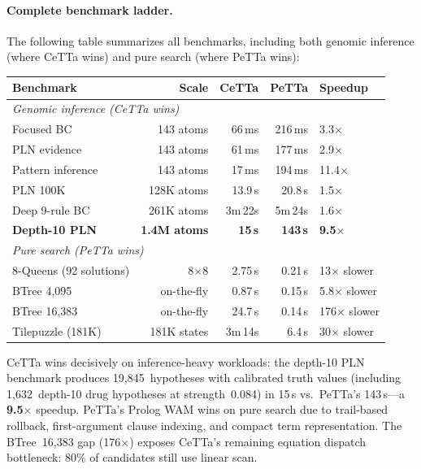\documentclass[11pt]{article}
\newcommand{\PeTTa}{\textup{PeTTa}}
\newcommand{\CeTTa}{\textup{CeTTa}}
\begin{document}
\paragraph{Complete benchmark ladder.}
The following table summarizes all benchmarks, including both genomic
inference (where \CeTTa{} wins) and pure search (where \PeTTa{} wins):

\begin{center}
\begin{tabular}{lrrrl}
\toprule
Benchmark & Scale & \CeTTa{} & \PeTTa{} & Speedup \\
\midrule
\multicolumn{5}{l}{\emph{Genomic inference (\CeTTa{} wins)}} \\
Focused BC         &     143 atoms &   66\,ms &   216\,ms & 3.3$\times$ \\
PLN evidence       &     143 atoms &   61\,ms &   177\,ms & 2.9$\times$ \\
Pattern inference  &     143 atoms &   17\,ms &   194\,ms & 11.4$\times$ \\
PLN 100K           & 128K atoms    &  13.9\,s &   20.8\,s & 1.5$\times$ \\
Deep 9-rule BC     & 261K atoms    & 3m\,22s  &  5m\,24s  & 1.6$\times$ \\
\textbf{Depth-10 PLN}  & \textbf{1.4M atoms}
                        & \textbf{15\,s} & \textbf{143\,s} & \textbf{9.5$\times$} \\
\midrule
\multicolumn{5}{l}{\emph{Pure search (\PeTTa{} wins)}} \\
8-Queens (92 solutions) &  8$\times$8 &  2.75\,s &  0.21\,s & 13$\times$ slower \\
BTree 4{,}095           & on-the-fly  &  0.87\,s &  0.15\,s & 5.8$\times$ slower \\
BTree 16{,}383          & on-the-fly  &  24.7\,s &  0.14\,s & 176$\times$ slower \\
Tilepuzzle (181K)       & 181K states & 3m\,14s  &  6.4\,s  & 30$\times$ slower \\
\bottomrule
\end{tabular}
\end{center}

\CeTTa{} wins decisively on inference-heavy workloads: the depth-10
PLN benchmark produces 19{,}845~hypotheses with calibrated truth values
(including 1{,}632~depth-10 drug hypotheses at strength~0.084) in
15\,s vs.\ \PeTTa{}'s 143\,s---a \textbf{9.5$\times$} speedup.
\PeTTa{}'s Prolog WAM wins on pure search due to trail-based rollback,
first-argument clause indexing, and compact term representation.
The BTree~16{,}383 gap (176$\times$) exposes \CeTTa{}'s remaining
equation dispatch bottleneck: 80\% of candidates still use linear scan.
\end{document}
